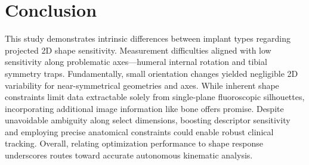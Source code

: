 \section{Conclusion}
This study demonstrates intrinsic differences between implant types regarding projected 2D shape sensitivity.
Measurement difficulties aligned with low sensitivity along problematic axes—humeral internal rotation and tibial symmetry traps.
Fundamentally, small orientation changes yielded negligible 2D variability for near-symmetrical geometries and axes.
While inherent shape constraints limit data extractable solely from single-plane fluoroscopic silhouettes, incorporating additional image information like bone offers promise.
Despite unavoidable ambiguity along select dimensions, boosting descriptor sensitivity and employing precise anatomical constraints could enable robust clinical tracking.
Overall, relating optimization performance to shape response underscores routes toward accurate autonomous kinematic analysis.


